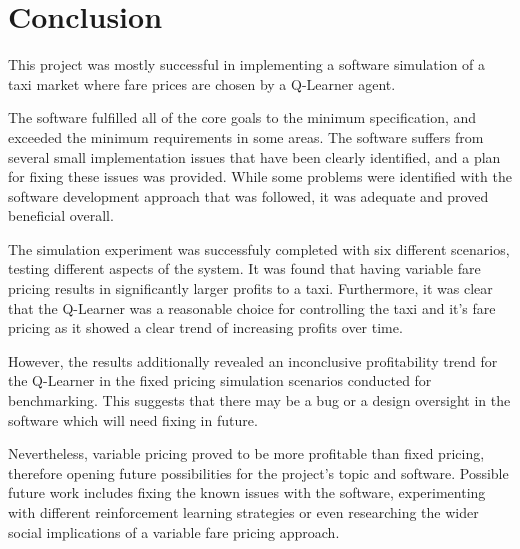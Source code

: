 \newpage
\section{Conclusion}
\label{sec:conclusion}

This project was mostly successful in implementing a software simulation of a
taxi market where fare prices are chosen by a Q-Learner agent. 

The software fulfilled all of the core goals to the minimum specification, and
exceeded the minimum requirements in some areas. The software suffers from
several small implementation issues that have been clearly identified, and a
plan for fixing these issues was provided. While some problems were identified
with the software development approach that was followed, it was adequate and
proved beneficial overall.

The simulation experiment was successfuly completed with six different
scenarios, testing different aspects of the system. It was found that having
variable fare pricing results in significantly larger profits to a taxi.
Furthermore, it was clear that the Q-Learner was a reasonable choice for
controlling the taxi and it's fare pricing as it showed a clear trend of
increasing profits over time.

However, the results additionally revealed an inconclusive profitability trend
for the Q-Learner in the fixed pricing simulation scenarios conducted for
benchmarking. This suggests that there may be a bug or a design oversight in
the software which will need fixing in future.

Nevertheless, variable pricing proved to be more profitable than fixed pricing,
therefore opening future possibilities for the project's topic and software.
Possible future work includes fixing the known issues with the software,
experimenting with different reinforcement learning strategies or even
researching the wider social implications of a variable fare pricing approach.
